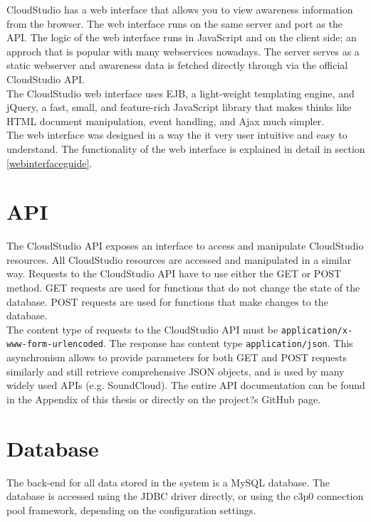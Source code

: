 CloudStudio has a web interface that allows you to view awareness information from the browser. The web interface runs on the same server and port as the API. The logic of the web interface runs in JavaScript and on the client side; an approch that is popular with many webservices nowadays. The server serves as a static webserver and awareness data is fetched directly through via the official CloudStudio API. \\

The CloudStudio web interface uses EJB, a light-weight templating engine, and jQuery, a fast, small, and feature-rich JavaScript library that makes thinks like HTML document manipulation, event handling, and Ajax much simpler. \\

The web interface was designed in a way the it very user intuitive and easy to understand. The functionality of the web interface is explained in detail in section \ref{webinterfaceguide}.



\section{API}

The CloudStudio API exposes an interface to access and manipulate CloudStudio resources. All CloudStudio resources are accessed and manipulated in a similar way. Requests to the CloudStudio API have to use either the GET or POST method. GET requests are used for functions that do not change the state of the database. POST requests are used for functions that make changes to the database. \\

The content type of requests to the CloudStudio API must be \texttt{application/x-www-form-urlencoded}. The response has content type \texttt{application/json}. This asynchronism allows to provide parameters for both GET and POST requests similarly and still retrieve comprehensive JSON objects, and is used by many widely used APIs (e.g. SoundCloud). The entire API documentation can be found in the Appendix of this thesis or directly on the project?s GitHub page.



\section{Database}\label{database}

The back-end for all data stored in the system is a MySQL database. The database is accessed using the JDBC driver directly, or using the c3p0 connection pool framework, depending on the configuration settings.

